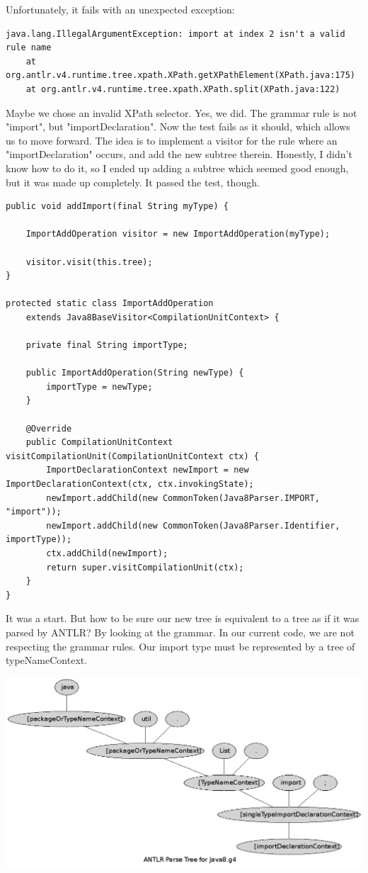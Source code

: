 \documentclass[11pt]{article}
\begin{document}
Unfortunately, it fails with an unexpected exception:

\begin{verbatim}
java.lang.IllegalArgumentException: import at index 2 isn't a valid rule name
    at org.antlr.v4.runtime.tree.xpath.XPath.getXPathElement(XPath.java:175)
    at org.antlr.v4.runtime.tree.xpath.XPath.split(XPath.java:122)
\end{verbatim}

Maybe we chose an invalid XPath selector. Yes, we did. The grammar rule is not "import", but "importDeclaration".
Now the test fails as it should, which allows us to move forward. The idea is to implement a visitor for the rule where
an "importDeclaration" occurs, and add the new subtree therein. Honestly, I didn't know how to do it, so I ended up
adding a subtree which seemed good enough, but it was made up completely. It passed the test, though.

\begin{verbatim}
public void addImport(final String myType) {

    ImportAddOperation visitor = new ImportAddOperation(myType);

    visitor.visit(this.tree);
}

protected static class ImportAddOperation
    extends Java8BaseVisitor<CompilationUnitContext> {

    private final String importType;

    public ImportAddOperation(String newType) {
        importType = newType;
    }

    @Override
    public CompilationUnitContext visitCompilationUnit(CompilationUnitContext ctx) {
        ImportDeclarationContext newImport = new ImportDeclarationContext(ctx, ctx.invokingState);
        newImport.addChild(new CommonToken(Java8Parser.IMPORT, "import"));
        newImport.addChild(new CommonToken(Java8Parser.Identifier, importType));
        ctx.addChild(newImport);
        return super.visitCompilationUnit(ctx);
    }
}
\end{verbatim}

It was a start. But how to be sure our new tree is equivalent to a tree as if it was parsed by ANTLR? By looking at the grammar.
In our current code, we are not respecting the grammar rules. Our import type must be represented by a tree of typeNameContext.

\includegraphics[width=.9\linewidth]{antlr-tree.png}
\end{document}
